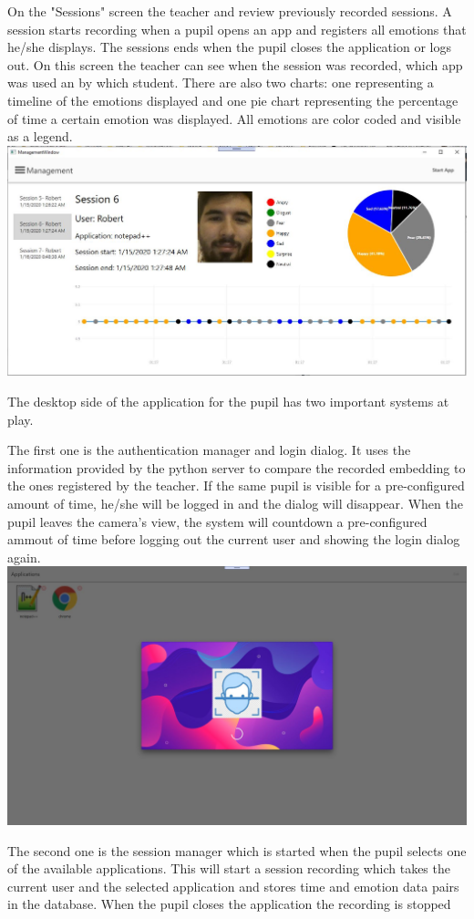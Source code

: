 \documentclass[runningheads,a4paper,11pt]{report}
\begin{document}
\pagebreak
On the "Sessions" screen the teacher and review previously recorded sessions. A session starts recording when a pupil opens an app and registers all emotions that he/she displays. The sessions ends when the pupil closes the application or logs out. On this screen the teacher can see when the session was recorded, which app was used an by which student. There are also two charts: one representing a timeline of the emotions displayed and one pie chart representing the percentage of time a certain emotion was displayed. All emotions are color coded and visible as a legend.
\newline
\includegraphics[width=0.5\linewidth]{./Fig/Sessions.JPG}

The desktop side of the application for the pupil has two important systems at play.

The first one is the authentication manager and login dialog. It uses the information provided by the python server to compare the recorded embedding to the ones registered by the teacher. If the same pupil is visible for a pre-configured amount of time, he/she will be logged in and the dialog will disappear. When the pupil leaves the camera's view, the system will countdown a pre-configured ammout of time before logging out the current user and showing the login dialog again.
\newline
\includegraphics[width=0.5\linewidth]{./Fig/Login.JPG}

The second one is the session manager which is started when the pupil selects one of the available applications. This will start a session recording which takes the current user and the selected application and stores time and emotion data pairs in the database. When the pupil closes the application the recording is stopped
\end{document}
